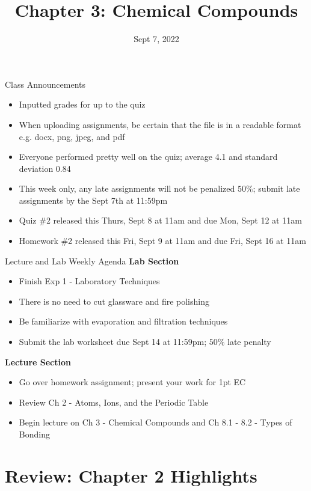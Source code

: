 \documentclass[11pt]{beamer}
\title{Chapter 3: Chemical Compounds}
\institute{Chemistry Department, Cypress College}
\date{Sept 7, 2022}
\begin{document}
\begin{frame}
  \titlepage
\end{frame}

\begin{frame}{Class Announcements}
  \begin{itemize}
  \item Inputted grades for up to the quiz
  \item When uploading assignments, be certain that
    the file is in a readable format e.g. docx, png, jpeg,
    and pdf
  \item Everyone performed pretty well on the quiz; average
    4.1 and standard deviation 0.84
  \item This week only, any late assignments will not be
    penalized $50\%$; submit late assignments by the Sept 7th
    at 11:59pm
  \item Quiz \#2 released this Thurs, Sept 8 at 11am and due Mon,
    Sept 12 at 11am
  \item Homework \#2 released this Fri, Sept 9 at 11am and due
    Fri, Sept 16 at 11am
  \end{itemize}  
\end{frame}

\begin{frame}{Lecture and Lab Weekly Agenda}
  \textbf{Lab Section}

  \begin{itemize}
  \item Finish Exp 1 - Laboratory Techniques
  \item There is no need to cut glassware and fire
    polishing
  \item Be familiarize with evaporation and filtration
    techniques
  \item Submit the lab worksheet due Sept 14 at 11:59pm;
    $50\%$ late penalty 
  \end{itemize}

  \textbf{Lecture Section}

  \begin{itemize}
  \item Go over homework assignment; present your work
    for 1pt EC
  \item Review Ch 2 - Atoms, Ions, and the Periodic Table
  \item Begin lecture on Ch 3 - Chemical Compounds and
    Ch 8.1 - 8.2 - Types of Bonding
  \end{itemize}
\end{frame}

\section{Review: Chapter 2 Highlights}
\end{document}
